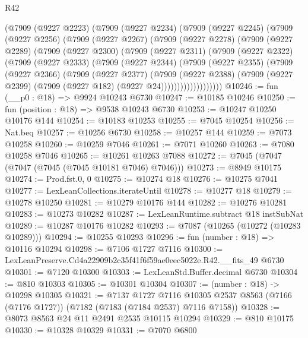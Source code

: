 \begin{lexlean}{R42}
\begin{coremodule}
{    (@7909
      (@9227 @2223)
      (@7909
        (@9227 @2234)
        (@7909
          (@9227 @2245)
          (@7909
            (@9227 @2256)
            (@7909
              (@9227 @2267)
              (@7909
                (@9227 @2278)
                (@7909
                  (@9227 @2289)
                  (@7909
                    (@9227 @2300)
                    (@7909
                      (@9227 @2311)
                      (@7909
                        (@9227 @2322)
                        (@7909
                          (@9227 @2333)
                          (@7909
                            (@9227 @2344)
                            (@7909
                              (@9227 @2355)
                              (@7909
                                (@9227 @2366)
                                (@7909
                                  (@9227 @2377)
                                  (@7909
                                    (@9227 @2388)
                                    (@7909
                                      (@9227 @2399)
                                      (@7909 (@9227 @182) (@9227 @24)))))))))))))))))))
@10246 := fun (__p0 : @18) => @9924 @10243 @6730
@10247 := @10185 @10246
@10250 := fun (position : @18) => @9538 @10243 @6730
@10253 := @10247 @10250 @10176 @144
@10254 := @10183 @10253
@10255 := @7045 @10254
@10256 := Nat.beq
@10257 := @10256 @6730
@10258 := @10257 @144
@10259 := @7073 @10258
@10260 := @10259 @7046
@10261 := @7071 @10260
@10263 := @7080 @10258 @7046
@10265 := @10261 @10263 @7088
@10272 := @7045 (@7047 (@7047 (@7045 (@7045 @10181 @7046) @7046)))
@10273 := @8949 @10175
@10274 := Prod.fst.{0, 0}
@10275 := @10274 @18
@10276 := @10275 @7041
@10277 := LexLeanCollections.iterateUntil
@10278 := @10277 @18
@10279 := @10278 @10250
@10281 := @10279 @10176 @144
@10282 := @10276 @10281
@10283 := @10273 @10282
@10287 := LexLeanRuntime.subtract @18 instSubNat
@10289 := @10287 @10176 @10282
@10293 := @7087 (@10265 (@10272 (@10283 @10289)))
@10294 := @10255 @10293
@10296 := fun (number : @18) => @10116 @10294
@10298 := @7106 @1727 @7116
@10300 := LexLeanPreserve.Cd4a22909b2c35f41f6f59ae0eec5022e.R42.__fits_49 @6730
@10301 := @7120 @10300
@10303 := LexLeanStd.Buffer.decimal @6730
@10304 := @810 @10303
@10305 := @10301 @10304
@10307 := (number : @18) -> @10298 @10305
@10321 := @7137
    @1727
    @7116
    @10305
    @2537
    @8563
    (@7166 (@7176 @1727))
    (@7182 (@7183 (@7184 @2537) @7116 @7158))
@10328 := @8073 @8563 @24 @11 @2491 @2535 @10115 @10294
@10329 := @810 @10175
@10330 := @10328 @10329
@10331 := @7070 @6800
}
\end{coremodule}
\end{lexlean}
